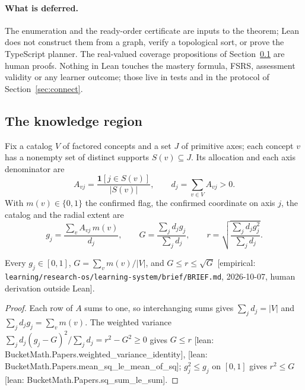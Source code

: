 \documentclass[11pt]{article}
\newcommand{\emp}[1]{\textcolor{bucketgray}{\footnotesize [empirical: #1]}}
\newcommand{\bm}[1]{\textcolor{bucketgray}{\footnotesize [lean: #1]}}
\newcommand{\brief}{\emp{\texttt{learning/\allowbreak research-os/\allowbreak learning-system/\allowbreak brief/\allowbreak BRIEF.\allowbreak md}, 2026-10-07, human derivation outside Lean}}
\begin{document}
\paragraph{What is deferred.}
The enumeration and the ready-order certificate are inputs to the theorem; Lean does not construct them from a graph, verify a topological sort, or prove the TypeScript planner. The real-valued coverage propositions of Section~\ref{sec:coverage} are human proofs. Nothing in Lean touches the mastery formula, FSRS, assessment validity or any learner outcome; those live in tests and in the protocol of Section~\ref{sec:connect}.

\subsection{The knowledge region}
\label{sec:coverage}

\begin{definition}[Coverage]
\label{def:coverage}
Fix a catalog $V$ of factored concepts and a set $J$ of primitive axes; each concept $v$ has a nonempty set of distinct supports $S(v) \subseteq J$. Its allocation and each axis denominator are
\begin{equation}
  A_{vj} = \frac{\mathbf{1}[j \in S(v)]}{|S(v)|}, \qquad d_j = \sum_{v \in V} A_{vj} > 0 .
  \label{eq:alloc}
\end{equation}
With $m(v) \in \{0, 1\}$ the confirmed flag, the confirmed coordinate on axis $j$, the catalog  and the radial extent are
\begin{equation}
  g_j = \frac{\sum_v A_{vj}\, m(v)}{d_j}, \qquad G = \frac{\sum_j d_j g_j}{\sum_j d_j}, \qquad r = \sqrt{\frac{\sum_j d_j g_j^2}{\sum_j d_j}} .
  \label{eq:coverage}
\end{equation}
\end{definition}

\begin{proposition}
\label{prop:bounds}
Every $g_j \in [0, 1]$, $G = \sum_v m(v) / |V|$, and $G \leq r \leq \sqrt{G}$ \brief.
\end{proposition}

\begin{proof}
Each row of $A$ sums to one, so interchanging sums gives $\sum_j d_j = |V|$ and $\sum_j d_j g_j = \sum_v m(v)$. The weighted variance $\sum_j d_j (g_j - G)^2 / \sum_j d_j = r^2 - G^2 \geq 0$ gives $G \leq r$ \bm{BucketMath.Papers.weighted\_variance\_identity}, \bm{BucketMath.Papers.mean\_sq\_le\_mean\_of\_sq}; $g_j^2 \leq g_j$ on $[0, 1]$ gives $r^2 \leq G$ \bm{BucketMath.Papers.sq\_sum\_le\_sum}.
\end{proof}
\end{document}
